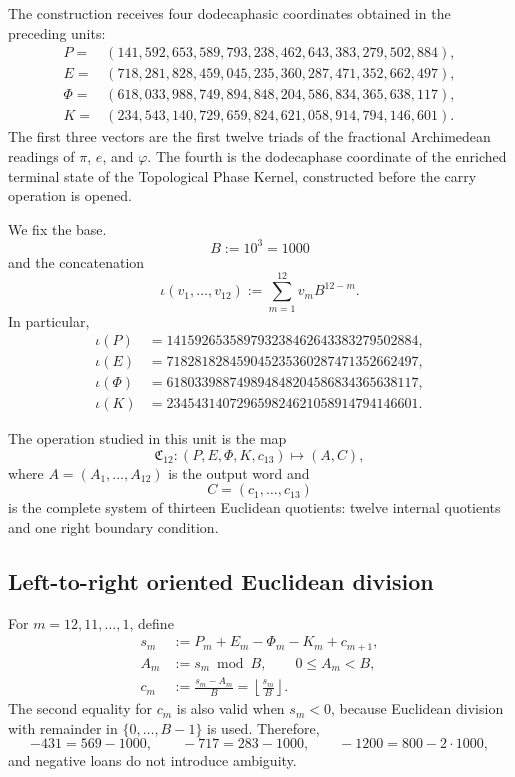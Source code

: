 The construction receives four dodecaphasic coordinates obtained in the preceding units:
\[
\begin{aligned}
 P={}&(141,592,653,589,793,238,462,643,383,279,502,884),\\
 E={}&(718,281,828,459,045,235,360,287,471,352,662,497),\\
 \Phi={}&(618,033,988,749,894,848,204,586,834,365,638,117),\\
 K={}&(234,543,140,729,659,824,621,058,914,794,146,601).
\end{aligned}
\]
The first three vectors are the first twelve triads of the fractional
Archimedean readings of \(\pi\), \(e\), and \(\varphi\). The fourth is
the dodecaphase coordinate of the enriched terminal state of the Topological
Phase Kernel, constructed before the carry operation is opened.

We fix the base.
\[
 B:=10^3=1000
\]
and the concatenation
\begin{equation}
 \iota(v_1,\ldots,v_{12})
 :=\sum_{m=1}^{12}v_mB^{12-m}.
 \label{p3-83-c25-s5:eq:concatenacion-base-mil-alpha}
\end{equation}
In particular,
\[
\begin{aligned}
 \iota(P)&=141592653589793238462643383279502884,\\
 \iota(E)&=718281828459045235360287471352662497,\\
 \iota(\Phi)&=618033988749894848204586834365638117,\\
 \iota(K)&=234543140729659824621058914794146601.
\end{aligned}
\]

The operation studied in this unit is the map
\begin{equation}
 \mathfrak C_{12}:
 (P,E,\Phi,K,c_{13})
 \longmapsto(A,C),
 \label{p3-83-c25-s5:eq:mapa-cierre-dodecafasico-alpha}
\end{equation}
where \(A=(A_1,\ldots,A_{12})\) is the output word and
\[
 C=(c_1,\ldots,c_{13})
\]
is the complete system of thirteen Euclidean quotients: twelve internal
quotients and one right boundary condition.

\subsection{Left-to-right oriented Euclidean division}

For \(m=12,11,\ldots,1\), define
\begin{equation}
\begin{aligned}
 s_m&:=P_m+E_m-\Phi_m-K_m+c_{m+1},\\
 A_m&:=s_m\bmod B,
       \qquad 0\leq A_m<B,\\
 c_m&:=\frac{s_m-A_m}{B}
      =\left\lfloor\frac{s_m}{B}\right\rfloor .
\end{aligned}
\label{p3-83-c25-s5:eq:recurrencia-corta-alpha}
\end{equation}
The second equality for \(c_m\) is also valid when \(s_m<0\),
because Euclidean division with remainder in
\(\{0,\ldots,B-1\}\) is used. Therefore,
\[
 -431=569-1000,
 \qquad
 -717=283-1000,
 \qquad
 -1200=800-2\cdot1000,
\]
and negative loans do not introduce ambiguity.


